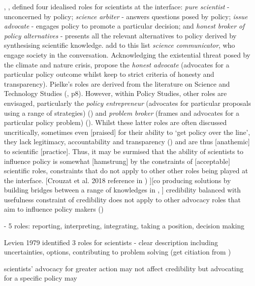 , \textcite{Pielke2007}, defined four idealised roles for scientists at the interface: \emph{pure scientist} - unconcerned by policy; \emph{science arbiter} - answers questions posed by policy; \emph{issue advocate} - engages policy to promote a particular decision; and \emph{honest broker of policy alternatives} - presents all the relevant alternatives to policy derived by synthesising scientific knowledge. \textcite{RapleyD2014} add to this list \emph{science communicator}, who engage society in the conversation. Acknowledging the existential threat posed by the climate and nature crisis, \textcite{GregoryBW2024} propose the \emph{honest advocate} (advocates for a particular policy outcome whilst keep to strict criteria of honesty and transparency).  Pielke's roles are derived from the literature on Science and Technology Studies (\cite{Pielke2007}, p8). However, within Policy Studies, other roles are envisaged, particularly the \emph{policy entrepreneur} (advocates for particular proposals using a range of strategies) (\cite{Kingdon1993,Cairney2018}) and \emph{problem broker} (frames and advocates for a particular policy problem) (\cite{Knaggard2015}). Whilst these latter roles are often discussed uncritically, sometimes even [praised] for their ability to `get policy over the line', they lack legitimacy, accountability and transparency (\cite{vonMalmborg2024strategies}) and are thus [anathemic] to scientific [practice]. Thus, it may be surmised that the ability of scientists to influence policy is somewhat [hamstrung] by the constraints of [acceptable] scientific roles, constraints that do not apply to other other roles being played at the interface. [Crouzat et al. 2018 reference in \cite{BalvaneraJNOBCDGGKKMPSSW2020}) ][co producing solutions by building bridges between a range of knowledges \cite{NorstromEtAl2020} in \cite{BalvaneraJNOBCDGGKKMPSSW2020}, \cite{MatukBSAHT2020}]
credibility balanced with usefulness \cite{WesselinkH2020}
constraint of credibility does not apply to other advocacy roles that aim to influence policy makers (\cite{Kingdon1993,Knaggard2015,Cairney2018,vonMalmborg2024strategies})

\cite{SteelLLS2004,SinghTKMMC2014} - 5 roles: reporting, interpreting, integrating, taking a position, decision making

Levien 1979 identified 3 roles for scientists - clear description including uncertainties, options, contributing to problem solving (get citiation from \cite{SteelLLS2004})

\cite{ColognaKMBMO2024} scientists' advocacy for greater action may not affect credibility but advocating for a specific policy may

